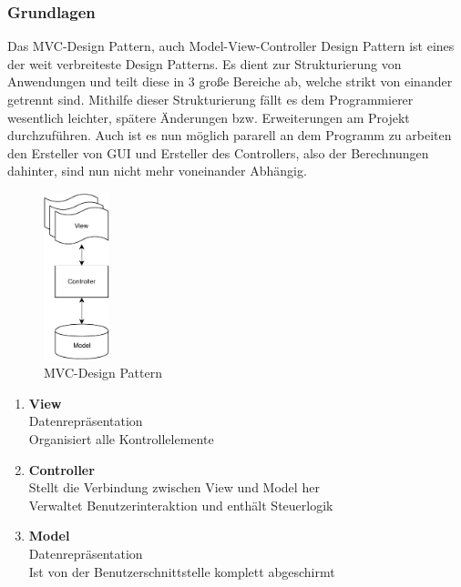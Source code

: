 \subsubsection{Grundlagen}
Das MVC-Design Pattern, auch Model-View-Controller Design Pattern ist eines der weit verbreiteste Design Patterns. Es dient zur Strukturierung von Anwendungen und teilt diese in 3 große Bereiche ab, welche strikt von einander getrennt sind.
Mithilfe dieser Strukturierung fällt es dem Programmierer wesentlich leichter, spätere Änderungen bzw. Erweiterungen am Projekt durchzuführen. Auch ist es nun möglich pararell an dem Programm zu arbeiten den Ersteller von GUI und Ersteller des Controllers, also der Berechnungen dahinter, sind nun nicht mehr voneinander Abhängig.
\newpage
\begin{figure}
    \vspace{-310pt}
    \begin{center}
        \includegraphics[width=0.17\textwidth]{fig/ainf/ModelViewController.pdf}
    \end{center}
    \caption{MVC-Design Pattern}
    \vspace{20pt}
\end{figure}


\begin{enumerate}
    \item \textbf{View}  \\
    Datenrepräsentation\\
    Organisiert alle Kontrollelemente
    \item \textbf{Controller} \\
    Stellt die Verbindung zwischen View und Model her\\
    Verwaltet Benutzerinteraktion und enthält Steuerlogik
    \item \textbf{Model} \\
    Datenrepräsentation\\
    Ist von der Benutzerschnittstelle komplett abgeschirmt
\end{enumerate}
\vspace{20pt}

